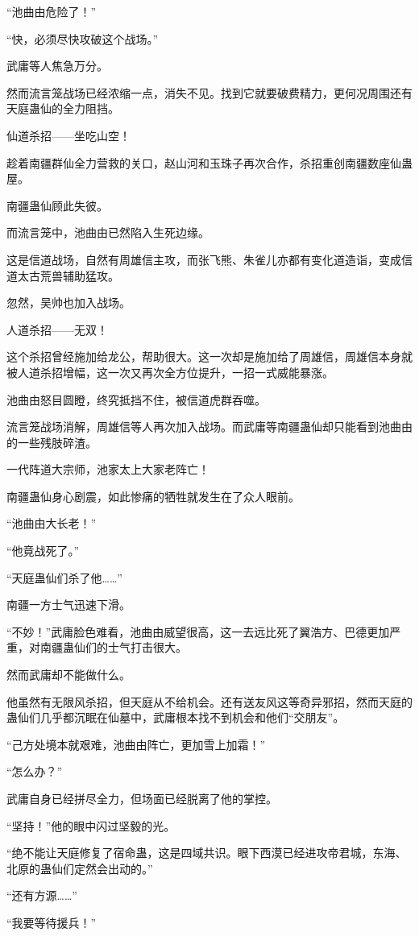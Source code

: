 \begin{this_body}
“池曲由危险了！”

“快，必须尽快攻破这个战场。”

武庸等人焦急万分。

然而流言笼战场已经浓缩一点，消失不见。找到它就要破费精力，更何况周围还有天庭蛊仙的全力阻挡。

仙道杀招——坐吃山空！

趁着南疆群仙全力营救的关口，赵山河和玉珠子再次合作，杀招重创南疆数座仙蛊屋。

南疆蛊仙顾此失彼。

而流言笼中，池曲由已然陷入生死边缘。

这是信道战场，自然有周雄信主攻，而张飞熊、朱雀儿亦都有变化道造诣，变成信道太古荒兽辅助猛攻。

忽然，吴帅也加入战场。

人道杀招——无双！

这个杀招曾经施加给龙公，帮助很大。这一次却是施加给了周雄信，周雄信本身就被人道杀招增幅，这一次又再次全方位提升，一招一式威能暴涨。

池曲由怒目圆瞪，终究抵挡不住，被信道虎群吞噬。

流言笼战场消解，周雄信等人再次加入战场。而武庸等南疆蛊仙却只能看到池曲由的一些残肢碎渣。

一代阵道大宗师，池家太上大家老阵亡！

南疆蛊仙身心剧震，如此惨痛的牺牲就发生在了众人眼前。

“池曲由大长老！”

“他竟战死了。”

“天庭蛊仙们杀了他……”

南疆一方士气迅速下滑。

“不妙！”武庸脸色难看，池曲由威望很高，这一去远比死了翼浩方、巴德更加严重，对南疆蛊仙们的士气打击很大。

然而武庸却不能做什么。

他虽然有无限风杀招，但天庭从不给机会。还有送友风这等奇异邪招，然而天庭的蛊仙们几乎都沉眠在仙墓中，武庸根本找不到机会和他们“交朋友”。

“己方处境本就艰难，池曲由阵亡，更加雪上加霜！”

“怎么办？”

武庸自身已经拼尽全力，但场面已经脱离了他的掌控。

“坚持！”他的眼中闪过坚毅的光。

“绝不能让天庭修复了宿命蛊，这是四域共识。眼下西漠已经进攻帝君城，东海、北原的蛊仙们定然会出动的。”

“还有方源……”

“我要等待援兵！”


\end{this_body}
